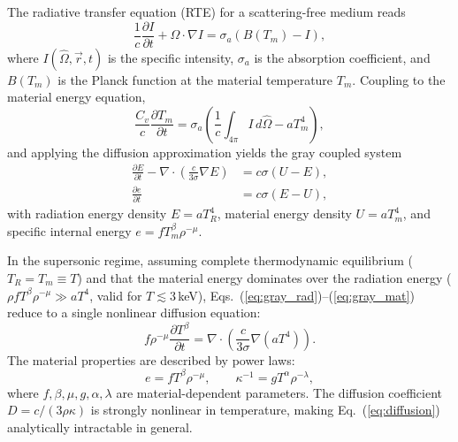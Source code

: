 \documentclass[prl, twocolumn, superscriptaddress, amsmath, amssymb, reprint]{revtex4-2}
\begin{document}
The radiative transfer equation (RTE) for a scattering-free medium reads
\begin{equation}\label{eq:RTE}
    \frac{1}{c}\frac{\partial I}{\partial t}+\hat{\Omega}\cdot\nabla I = \sigma_a\!\left(B(T_m) - I\right),
\end{equation}
where $I(\hat{\Omega},\vec{r},t)$ is the specific intensity, $\sigma_a$ is the absorption coefficient, and $B(T_m)$ is the Planck function at the material temperature $T_m$.
Coupling to the material energy equation,
\begin{equation}\label{eq:material_energy}
    \frac{C_v}{c}\frac{\partial T_m}{\partial t} = \sigma_a\!\left(\frac{1}{c}\int_{4\pi} I\,d\hat{\Omega} - aT_m^4\right),
\end{equation}
and applying the diffusion approximation yields the gray coupled system
\begin{align}
    \frac{\partial E}{\partial t} - \nabla\!\cdot\!\left(\frac{c}{3\sigma}\nabla E\right) &= c\sigma(U - E),\label{eq:gray_rad}\\
    \frac{\partial e}{\partial t} &= c\sigma(E - U),\label{eq:gray_mat}
\end{align}
with radiation energy density $E = aT_R^4$, material energy density $U = aT_m^4$, and specific internal energy $e = fT_m^\beta\rho^{-\mu}$.

In the supersonic regime, assuming complete thermodynamic equilibrium ($T_R = T_m \equiv T$) and that the material energy dominates over the radiation energy ($\rho f T^\beta \rho^{-\mu} \gg aT^4$, valid for $T \lesssim 3$\,keV), Eqs.~(\ref{eq:gray_rad})--(\ref{eq:gray_mat}) reduce to a single nonlinear diffusion equation:
\begin{equation}\label{eq:diffusion}
    f\rho^{-\mu}\frac{\partial T^\beta}{\partial t} = \nabla\!\cdot\!\left(\frac{c}{3\sigma}\nabla(aT^4)\right).
\end{equation}
The material properties are described by power laws:
\begin{equation}\label{eq:power_laws}
    e = fT^\beta\rho^{-\mu}, \qquad \kappa^{-1} = gT^\alpha\rho^{-\lambda},
\end{equation}
where $f,\beta,\mu,g,\alpha,\lambda$ are material-dependent parameters.
The diffusion coefficient $D = c/(3\rho\kappa)$ is strongly nonlinear in temperature, making Eq.~(\ref{eq:diffusion}) analytically intractable in general.

\end{document}
